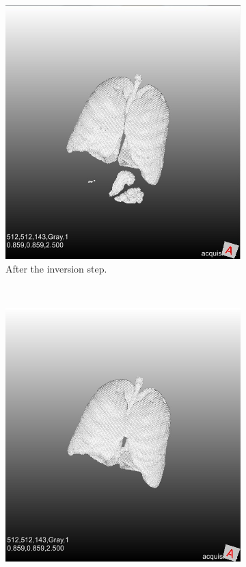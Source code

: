 \documentclass[a4paper,10pt]{article}
\numberwithin{equation}{section} %
\numberwithin{figure}{section} %
\numberwithin{table}{section} %
\begin{document}
\begin{figure}[h]
    ~ %
    \begin{subfigure}[b]{0.45\textwidth}
        \includegraphics[width=\textwidth]{lungs_with_meuk}
        \caption{After the inversion step.}
        \label{fig:lung-meuk}
    \end{subfigure}
    ~ %
    \begin{subfigure}[b]{0.45\textwidth}
        \includegraphics[width=\textwidth]{lungs_without_meuk}

\end{subfigure}
\end{figure}
\end{document}
